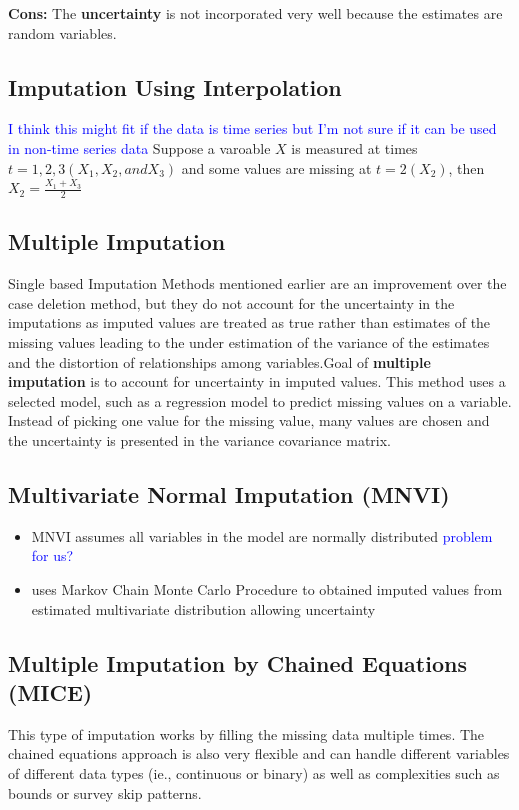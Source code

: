 \documentclass{article}
\begin{document}
\textbf{Cons:} The \textbf{uncertainty} is not incorporated very well because the estimates are random variables.

\subsection{Imputation Using Interpolation}
\textcolor{blue}{I think this might fit if the data is time series but I'm not sure if it can be used in non-time series data} Suppose a varoable $X$ is measured at times $t = 1, 2, 3 (X_1, X_2, and X_3)$ and some values are missing at $t=2 (X_2)$, then $X_2 = \frac{X_1 + X_3}{2}$

\subsection*{Multiple Imputation}
Single based Imputation Methods mentioned earlier are an improvement over the case deletion method, but they do not account for the uncertainty in the imputations as imputed values are treated as true rather than estimates of the missing values leading to the under estimation of the variance of the estimates and the distortion of relationships among variables.Goal of \textbf{multiple imputation} is to account for uncertainty in imputed values. This method uses a selected model, such as a regression model to predict missing values on a variable. Instead of picking one value for the missing value, many values are chosen and the uncertainty is presented in the variance covariance matrix.

\subsection{Multivariate Normal Imputation (MNVI)}
\begin{itemize}
\item MNVI assumes all variables in the model are normally distributed \textcolor{blue}{problem for us?}
\item uses Markov Chain Monte Carlo Procedure to obtained imputed values from estimated multivariate distribution allowing uncertainty
\end{itemize}

\subsection{Multiple Imputation by Chained Equations (MICE)}
This type of imputation works by filling the missing data multiple times. The chained equations approach is also very flexible and can handle different variables of different data types (ie., continuous or binary) as well as complexities such as bounds or survey skip patterns. 
\end{document}
